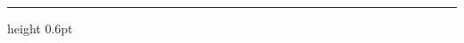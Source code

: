 \documentclass[11pt,letterpaper]{article}
\begin{document}


\tableofcontents
\vspace{0.4em}
{\color{hairline}\hrule height 0.6pt}






\end{document}
